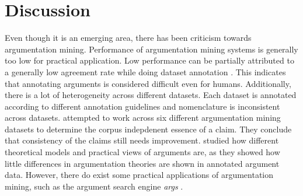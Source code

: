 

\section{Discussion}

Even though it is an emerging area, there has been criticism towards
argumentation mining.  Performance of argumentation mining systems is generally
too low for practical application. 
Low performance can be partially attributed to
a generally low agreement rate while doing dataset annotation
\citep{peldszus2015joint, boltuzic2017toward}. This indicates that annotating
arguments is considered difficult even for humans.
Additionally, there is a lot of heterogeneity across different datasets. 
Each dataset is annotated according to different annotation guidelines and
nomenclature is inconsistent across datasets.
\citet{daxenberger2017essence} attempted to work across six different 
argumentation mining datasets to determine the corpus indepdenent essence of a claim.
They conclude that consistency of the claims still needs improvement.
\citet{wachsmuth2017argumentation} studied how different theoretical
models and practical views of arguments are, as they showed how little
differences in argumentation theories are shown in annotated
argument data. 
However, there do exist some practical applications of 
argumentation mining, such as the argument search engine \emph{args}
\citep{wachsmuth2017building}.

